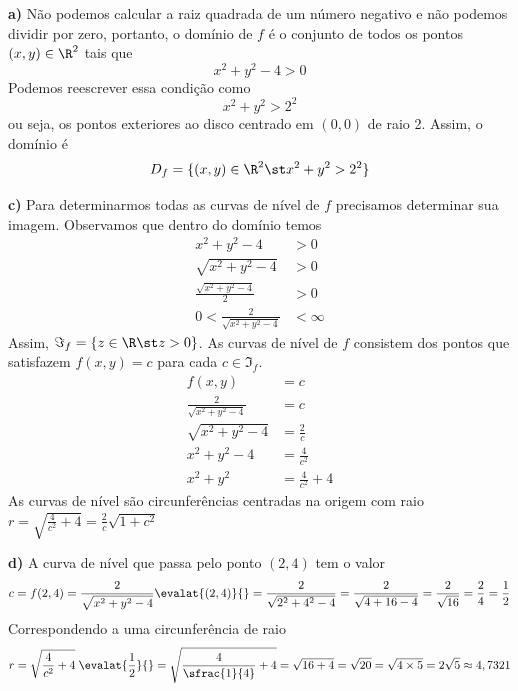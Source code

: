 \documentclass[a4paper,12pt,fleqn]{article}
\begin{document}
\begin{answer}
\textbf{a)} \quad
  Não podemos calcular a raiz quadrada de um número negativo e não
  podemos dividir por zero, portanto, o domínio de $f$ é o conjunto
  de todos os pontos \((x, y)\in\R^2\) tais que
  \[
    x^2 + y^2 - 4 > 0
  \]
  Podemos reescrever essa condição como
  \[
    x^2 + y^2 > 2^2
  \]
  ou seja, os pontos exteriores ao disco centrado em \((0, 0)\) de raio 2.
  Assim, o domínio é
  \[
    D_f = \{(x, y) \in \R^2 \st x^2 + y^2 > 2^2\}
  \]

\bigskip
\textbf{c)} \quad
  Para determinarmos todas as curvas de nível de $f$ precisamos determinar sua
  imagem. Observamos que dentro do domínio temos
  \begin{align*}
    x^2 + y^2 - 4                  & > 0 \\[2mm]
    \sqrt{x^2 + y^2 - 4}           & > 0 \\[2mm]
    \frac{\sqrt{x^2 + y^2 - 4}}{2} & > 0 \\[2mm]
    0 < \frac{2}{\sqrt{x^2 + y^2 - 4}} & < \infty
  \end{align*}
  Assim, \(\Im_f = \left\{z\in\R \st z > 0\right\}\).
  As curvas de nível de $f$ consistem dos pontos que satisfazem
  \(
    f(x, y) = c
  \)
  para cada \(c\in\Im_f\).
  \begin{align*}
    f(x, y)                        & = c                 \\[2mm]
    \frac{2}{\sqrt{x^2 + y^2 - 4}} & = c                 \\[2mm]
    \sqrt{x^2 + y^2 - 4}           & = \frac{2}{c}       \\[2mm]
    x^2 + y^2 - 4                  & = \frac{4}{c^2}     \\[2mm]
    x^2 + y^2                      & = \frac{4}{c^2} + 4
  \end{align*}
  As curvas de nível são circunferências centradas na origem com raio
  \(
    r
    = \sqrt{\frac{4}{c^2}+4}
    = \frac{2}{c}\sqrt{1+c^2}
  \)

\bigskip
\textbf{d)} \quad
A curva de nível que passa pelo ponto $(2, 4)$ tem o valor
\[
  c
  = f(2, 4)
  = \frac{2}{\sqrt{x^2 + y^2 - 4}}\evalat{(2, 4)}{}
  = \frac{2}{\sqrt{2^2 + 4^2 - 4}}
  = \frac{2}{\sqrt{4 + 16 - 4}}
  = \frac{2}{\sqrt{16}}
  = \frac{2}{4}
  = \frac{1}{2}
\]
Correspondendo a uma circunferência de raio
\[
  r
  = \sqrt{\frac{4}{c^2}+4}\;\evalat{\frac{1}{2}}{}
  = \sqrt{\frac{4}{\sfrac{1}{4}}+4}
  = \sqrt{16+4}
  = \sqrt{20}
  = \sqrt{4\times 5}
  = 2\sqrt{5}
  \approx 4,7321
\]

\end{answer}

\end{document}
